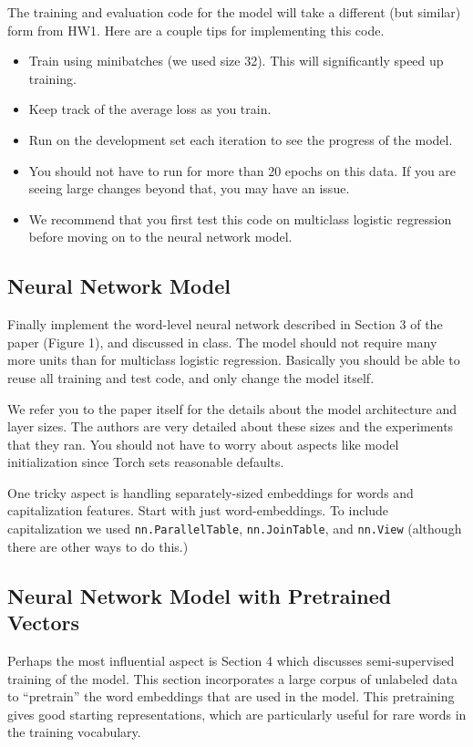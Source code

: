 \documentclass[11pt]{article}
\begin{document}
The training and evaluation code for the model will take a different (but similar) form 
from HW1. Here are a couple tips for implementing this code. 
 
 \begin{itemize}
 \item Train using minibatches (we used size 32). This will significantly speed up training. 
 \item Keep track of the average loss as you train. 
 \item Run on the development set each iteration to see the progress of the model.
 \item You should not have to run for more than 20 epochs on this data. If you are seeing large 
   changes beyond that, you may have an issue. 
 \item We recommend that you first test this code on multiclass
   logistic regression before moving on to the neural network model.
 \end{itemize}

\subsection{Neural Network Model}

Finally implement the word-level neural network described in Section 3
of the paper (Figure 1), and discussed in class. The model should not
require many more units than for multiclass logistic
regression. Basically you should be able to reuse all training and
test code, and only change the model itself.

We refer you to the paper itself for the details about the model
architecture and layer sizes. The authors are very detailed about
these sizes and the experiments that they ran. You should not have to
worry about aspects like model initialization since Torch sets
reasonable defaults.

One tricky aspect is handling separately-sized embeddings for words
and capitalization features. Start with just word-embeddings.  To
include capitalization we used \texttt{nn.ParallelTable},
\texttt{nn.JoinTable}, and \texttt{nn.View} (although there are other
ways to do this.)


\subsection{Neural Network Model with Pretrained Vectors}

Perhaps the most influential aspect is Section 4 which discusses
semi-supervised training of the model. This section incorporates a
large corpus of unlabeled data to ``pretrain'' the word embeddings
that are used in the model. This pretraining gives good starting
representations, which are particularly useful for rare words in the 
training vocabulary.
\end{document}
